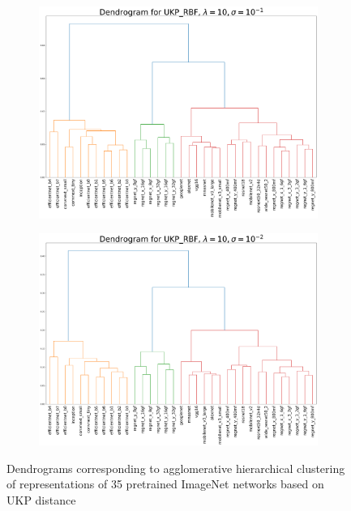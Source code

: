 \documentclass[11pt]{article}
\newcommand{\metricstname}{UKP }
\theoremstyle{plain}
\begin{document}
\begin{figure}[!h]
    \vspace{0.5cm}  %
    
    \begin{subfigure}[b]{0.45\textwidth}
        \includegraphics[width=\textwidth]{Appendix figures/imagenet_experiments/Dendogram final/Dendogram for UKP_dist_RBF_1.000000e+01_1.000000e-01.png}
    \end{subfigure}
    \hfill
    \begin{subfigure}[b]{0.45\textwidth}
        \includegraphics[width=\textwidth]{Appendix figures/imagenet_experiments/Dendogram final/Dendogram for UKP_dist_RBF_1.000000e+01_1.000000e-02.png}
    \end{subfigure}
    
    \caption{Dendrograms corresponding to agglomerative hierarchical clustering of representations of 35 pretrained ImageNet networks based on \metricstname distance}
    \label{ImageNet dendrograms}
\end{figure}
\end{document}
